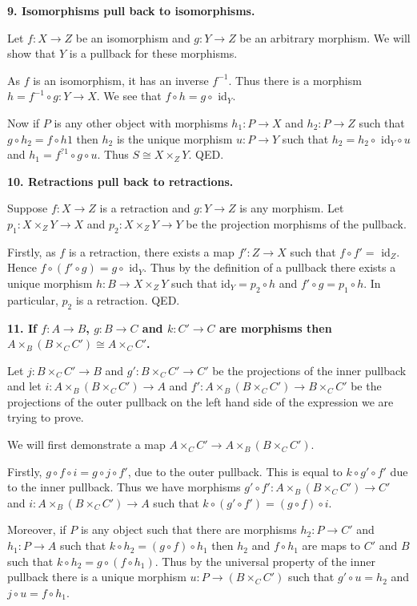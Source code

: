\documentclass[12pt]{article}
\begin{document}
\textbf{9. Isomorphisms pull back to isomorphisms.}

Let $f : X \to Z$ be an isomorphism and $g : Y \to Z$ be an arbitrary morphism. We will show that $Y$ is a pullback for these morphisms.

As $f$ is an isomorphism, it has an inverse $f^{-1}$. Thus there is a morphism $h = f^{-1}\circ g : Y \to X$. We see that $f\circ h = g\circ$ id$_Y$. 

Now if $P$ is any other object with morphisms $h_1 : P \to X$ and $h_2 : P \to Z$ such that $g\circ h_2 = f\circ h1$ then $h_2$ is the unique morphism $u : P \to Y$ such that $h_2 = h_2\circ$ id$_Y\circ u$ and $h_1 = f^{?1}\circ g\circ u$. Thus $S \cong X\times_Z Y$. QED.

\textbf{10. Retractions pull back to retractions.}

Suppose $f : X \to Z$ is a retraction and $g : Y \to Z$ is any morphism. Let $p_1 : X\times_Z Y \to X$ and $p_2 : X\times_Z Y \to Y$ be the projection morphisms of the pullback.

Firstly, as $f$ is a retraction, there exists a map $f' : Z \to X$ such that $f\circ f' =$ id$_Z$. Hence $f\circ (f'\circ g) = g\circ$ id$_Y$. Thus by the definition of a pullback there exists a unique morphism $h : B \to X\times_Z Y$ such that id$_Y = p_2\circ h$ and $f'\circ g = p_1\circ h$. In particular, $p_2$ is a retraction. QED.

\textbf{11. If $f : A \to B$, $g : B \to C$ and $k : C' \to C$ are morphisms then $A\times_B (B\times_C C') \cong A\times_C C'$.}

Let $j : B\times_C C' \to B$ and $g' : B\times_C C' \to C'$ be the projections of the inner pullback and let $i : A\times_B (B\times_C C') \to A$ and $f' : A\times_B (B\times_C C') \to B\times_C C'$ be the projections of the outer pullback on the left hand side of the expression we are trying to prove.

We will first demonstrate a map $A\times_C C' \to A\times_B (B\times_C C')$.

Firstly, $g\circ f\circ i = g\circ j\circ f'$, due to the outer pullback. This is equal to $k\circ g'\circ f'$ due to the inner pullback. Thus we have morphisms $g'\circ f' : A\times_B (B\times_C C') \to C'$ and $i : A\times_B (B\times_C C') \to A$ such that $k\circ (g'\circ f') = (g\circ f)\circ i$.

Moreover, if $P$ is any object such that there are morphisms $h_2 : P \to C'$ and $h_1 : P \to A$ such that $k\circ h_2 = (g\circ f)\circ h_1$ then $h_2$ and $f\circ h_1$ are maps to $C'$ and $B$ such that $k \circ h_2 = g\circ (f\circ h_1)$. Thus by the universal property of the inner pullback there is a unique morphism $u : P \to (B\times_C C')$ such that $g'\circ u = h_2$ and $j\circ u = f\circ h_1$.
\end{document}
